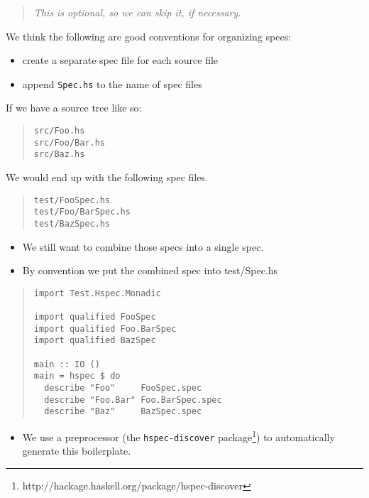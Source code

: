 \documentclass[preprint]{sigplanconf}
\begin{document}
\begin{quote}
\emph{This is optional, so we can skip it, if necessary.}
\end{quote}

\noindent We think the following are good conventions for organizing specs:
\begin{itemize}
    \item create a separate spec file for each source file
    \item append {\tt Spec.hs} to the name of spec files
\end{itemize}

\noindent If we have a source tree like so:

\begin{quote}
\small
\begin{verbatim}
src/Foo.hs
src/Foo/Bar.hs
src/Baz.hs
\end{verbatim}
\end{quote}

\noindent We would end up with the following spec files.

\begin{quote}
\small
\begin{verbatim}
test/FooSpec.hs
test/Foo/BarSpec.hs
test/BazSpec.hs
\end{verbatim}
\end{quote}

\begin{itemize}
\item We still want to combine those specs into a single spec.
\item By convention we put the combined spec into test/Spec.hs
\end{itemize}

\begin{quote}
\small
\begin{verbatim}
import Test.Hspec.Monadic

import qualified FooSpec
import qualified Foo.BarSpec
import qualified BazSpec

main :: IO ()
main = hspec $ do
  describe "Foo"     FooSpec.spec
  describe "Foo.Bar" Foo.BarSpec.spec
  describe "Baz"     BazSpec.spec
\end{verbatim}
\end{quote}

\begin{itemize}
\item We use a preprocessor (the {\tt hspec-discover} package\footnote{%
http://hackage.haskell.org/package/hspec-discover}) to automatically generate this boilerplate.
\end{itemize}
\end{document}
